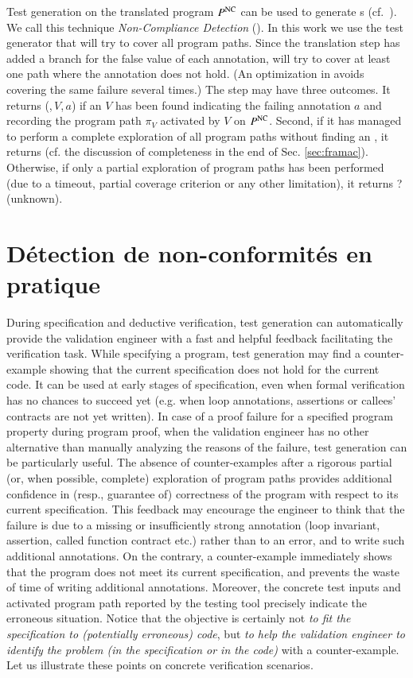 Test generation on the translated program $P^{\mathrm{NC}}$ 
can be used to generate \NCCE{}s (cf.~\cite{Petiot/SCAM14}).
We call this technique \emph{Non-Compliance Detection} (\NCD).
In this work we use the \pathcrawler test generator that
will try to cover all program paths.
Since the translation step has added a branch for the false
value of each annotation, \pathcrawler will try to cover at
least one path where the annotation does not hold.
(An optimization in \pathcrawler avoids covering the 
same \fassert failure several times.)
The \NCD step may have three outcomes.
It returns (\nc,\,$V$,\,$a$) if an \NCCE $V$ has been found
indicating the failing annotation $a$ and recording
the program path $\pi_V$ activated by $V$ on $P^{\mathrm{NC}}$.
Second, if it has managed to perform a complete exploration 
of all program paths without finding an \NCCE, it returns \no
(cf. the discussion of completeness in the end of Sec. \ref{sec:framac}).
Otherwise, if only a partial exploration of program paths
has been performed (due to a timeout,
partial coverage criterion or any other limitation), it returns 
\textsf{?} (unknown).


\section{Détection de non-conformités en pratique}
\label{sec:scenarios}


During specification and deductive
verification, test generation  can automatically provide the
validation engineer with a fast and helpful feedback facilitating the
verification task. While specifying a program, test generation
may find a counter-example showing that the current specification does not hold
for the current code. It can be used at early stages of specification,
even when formal verification has no chances to succeed yet (e.g. when loop
annotations, assertions or callees' contracts are not yet written).
In case of a proof failure for a specified program
property during program proof, when the validation engineer has no other
alternative than manually analyzing the reasons of the failure, test generation 
can be particularly useful. The absence of counter-examples after a rigorous
partial (or, when possible, complete) exploration of program paths provides
additional confidence in (resp., guarantee of) correctness of the
program with respect to its current specification. This feedback may encourage
the engineer to think that the failure is due to a missing or insufficiently
strong annotation (loop invariant, assertion, called function contract etc.) 
rather than to an error,
and to write such additional annotations. On the contrary, a counter-example
immediately shows that the program does not meet its current specification, and
prevents the waste of time of writing additional annotations. Moreover, the
concrete test inputs and activated program path reported by the testing
tool precisely indicate the erroneous situation.
Notice that the objective is certainly not \emph{to fit the specification to
(potentially erroneous) code}, but \emph{to help the validation engineer
to identify the problem (in the specification or in the code)}
with a counter-example. 
Let us illustrate these points on concrete verification scenarios.


